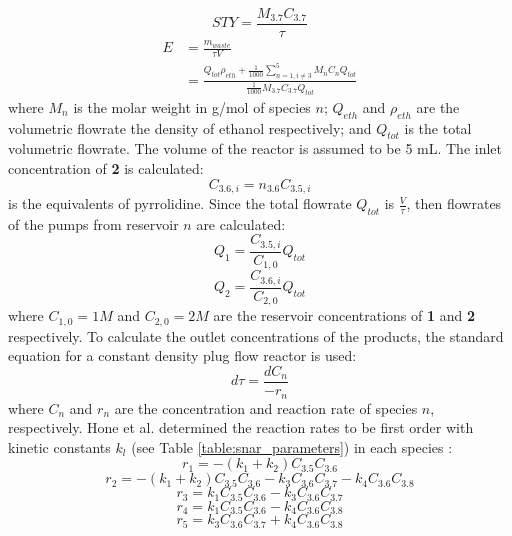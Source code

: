 \begin{equation}
    \label{sty}
	STY = \frac{M_{3.7} C_{3.7}}{\tau}
\end{equation}
\begin{equation}
    \label{e_factor}
	\begin{split}
	 E & = \frac{m_{waste}}{\tau V} \\ 
	   & = \frac{Q_{tot}\rho_{eth} + \frac{1}{1000}\sum_{n=1, i \neq 3}^5 M_nC_nQ_{tot}}{\frac{1}{1000}M_{3.7}C_{3.7}Q_{tot}}		
	\end{split}
\end{equation}
where $M_n$ is the molar weight in g/mol of species $n$; $Q_{eth}$ and $\rho_{eth}$ are the volumetric flowrate the density of ethanol respectively; and $Q_{tot}$ is the total volumetric flowrate. The volume of the reactor is assumed to be 5 mL. The inlet concentration of \textbf{2} is calculated:
\begin{equation}
    C_{3.6,i} = n_{3.6} C_{3.5,i}
\end{equation}
is the equivalents of pyrrolidine. Since the total flowrate $Q_{tot}$ is $\frac{V}{\tau}$, then flowrates of the pumps from reservoir $n$ are calculated:
\begin{equation}
    Q_1 = \frac{C_{3.5,i}}{C_{1,0}}Q_{tot}
\end{equation}
\begin{equation}
    Q_2 = \frac{C_{3.6,i}}{C_{2,0}}Q_{tot}
\end{equation}
where $C_{1,0}=1 M$ and $C_{2,0}=2 M$ are the reservoir concentrations of \textbf{1} and \textbf{2} respectively. To calculate the outlet concentrations of the products, the standard equation for a constant density plug flow reactor is used:
\begin{equation}
	\label{pfr}
	d\tau = \frac{dC_n}{- r_n}
\end{equation}
where $C_n$ and $r_n$ are the concentration and reaction rate of species $n$, respectively. Hone et al. determined the reaction rates to be first order with kinetic constants $k_l$ (see Table \ref{table:snar_parameters}) in each species \cite{Hone2017}:
\begin{equation}
    \label{equation:r_1}
	r_{1} = -(k_1+k_2)C_{3.5}C_{3.6}	
\end{equation}
\begin{equation}
	r_2 = -(k_1+k_2)C_{3.5}C_{3.6}-k_3C_{3.6}C_{3.7}-k_4C_{3.6}C_{3.8}
\end{equation}
\begin{equation}
	r_3 = k_1C_{3.5}C_{3.6}-k_3C_{3.6}C_{3.7}
\end{equation}
\begin{equation}
	r_4 = k_1C_{3.5}C_{3.6}-k_4C_{3.6}C_{3.8}
	\label{equation:r_4}
\end{equation}
\begin{equation}
	\label{last_snar_rxn_rate}
	r_5 = k_3C_{3.6}C_{3.7} + k_4C_{3.6}C_{3.8}
\end{equation}

